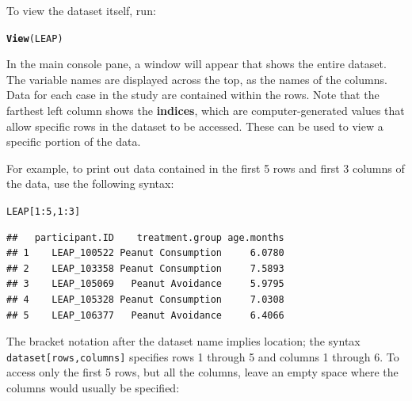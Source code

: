 \documentclass{article}\usepackage[]{graphicx}\usepackage[]{color}
\makeatletter
\newcommand{\hlnum}[1]{\textcolor[rgb]{0.686,0.059,0.569}{#1}}%
\newcommand{\hlopt}[1]{\textcolor[rgb]{0,0,0}{#1}}%
\newcommand{\hlstd}[1]{\textcolor[rgb]{0.345,0.345,0.345}{#1}}%
\newcommand{\hlkwd}[1]{\textcolor[rgb]{0.737,0.353,0.396}{\textbf{#1}}}%
\newenvironment{kframe}{%
 \def\at@end@of@kframe{}%
 \ifinner\ifhmode%
  \def\at@end@of@kframe{\end{minipage}}%
  \begin{minipage}{\columnwidth}%
 \fi\fi%
 \def\FrameCommand##1{\hskip\@totalleftmargin \hskip-\fboxsep
 \colorbox{shadecolor}{##1}\hskip-\fboxsep
     \hskip-\linewidth \hskip-\@totalleftmargin \hskip\columnwidth}%
 \MakeFramed {\advance\hsize-\width
   \@totalleftmargin\z@ \linewidth\hsize
   \@setminipage}}%
 {\par\unskip\endMakeFramed%
 \at@end@of@kframe}
\newenvironment{knitrout}{}{} %
\makeatother
\begin{document}
To view the dataset itself, run:

\begin{knitrout}
\color{fgcolor}\begin{kframe}
\begin{alltt}
\hlkwd{View}\hlstd{(LEAP)}
\end{alltt}
\end{kframe}
\end{knitrout}

In the main console pane, a window will appear that shows the entire dataset. The variable names are displayed across the top, as the names of the columns. Data for each case in the study are contained within the rows. Note that the farthest left column shows the \textbf{indices}, which are computer-generated values that allow specific rows in the dataset to be accessed. These can be used to view a specific portion of the data.

For example, to print out data contained in the first 5 rows and first 3 columns of the data, use the following syntax:

\begin{knitrout}
\color{fgcolor}\begin{kframe}
\begin{alltt}
\hlstd{LEAP[}\hlnum{1}\hlopt{:}\hlnum{5}\hlstd{,}\hlnum{1}\hlopt{:}\hlnum{3}\hlstd{]}
\end{alltt}
\begin{verbatim}
##   participant.ID    treatment.group age.months
## 1    LEAP_100522 Peanut Consumption     6.0780
## 2    LEAP_103358 Peanut Consumption     7.5893
## 3    LEAP_105069   Peanut Avoidance     5.9795
## 4    LEAP_105328 Peanut Consumption     7.0308
## 5    LEAP_106377   Peanut Avoidance     6.4066
\end{verbatim}
\end{kframe}
\end{knitrout}

The bracket notation after the dataset name implies location; the syntax \texttt{dataset[rows,columns]} specifies rows 1 through 5 and columns 1 through 6. To access only the first 5 rows, but all the columns, leave an empty space where the columns would usually be specified:
\end{document}
